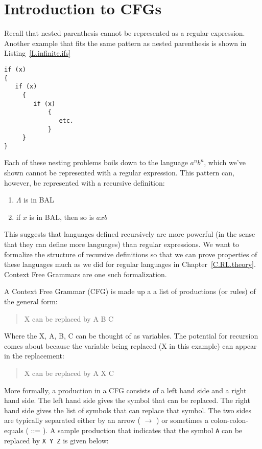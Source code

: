\documentclass[letterpaper,12pt,openany,reqno]{book}%
\newcommand{\code}[1] {\lstinline[breaklines=yes,breakatwhitespace=yes]{#1}}
\begin{document}
\section{Introduction to CFGs}
Recall that nested parenthesis cannot be represented as a regular expression. Another example that fits the same pattern as nested parenthesis is shown in Listing~\ref{L.infinite.ifs}
\begin{lstlisting}[caption={Nested if statements},label=L.infinite.ifs]
if (x)
{
   if (x)
	 {
	    if (x)
			{
			   etc.
			}
	 }
}
\end{lstlisting}
Each of these nesting problems boils down to the language $a^nb^n$, which we've shown cannot be represented with a regular expression. This pattern can, however, be represented with a recursive definition:
\begin{enumerate}
\item $\Lambda$ is in BAL
\item if $x$ is in BAL, then so is $axb$
\end{enumerate}

This suggests that languages defined recursively are more powerful (in the sense that they can define more languages) than regular expressions. We want to formalize the structure of recursive definitions so that we can prove properties of these languages much as we did for regular languages in Chapter~\ref{C.RL.theory}. Context Free Grammars are one such formalization.

A Context Free Grammar (CFG) is made up a a list of productions (or rules) of the general form:
\begin{quote}
X can be replaced by A B C
\end{quote}
Where the X, A, B, C can be thought of as variables. The potential for recursion comes about because the variable being replaced (X in this example) can appear in the replacement:
\begin{quote}
X can be replaced by A X C
\end{quote}

More formally, a production in a CFG consists of a left hand side and a right hand side. The left hand side gives the symbol that can be replaced. The right hand side gives the list of symbols that can replace that symbol. The two sides are typically separated 
either by an arrow ( $\rightarrow$ ) 
or sometimes a colon-colon-equals ( ::= ). 
A sample production that indicates that the symbol \code{A} 
can be replaced by \code{X Y Z} is given below:
\end{document}
